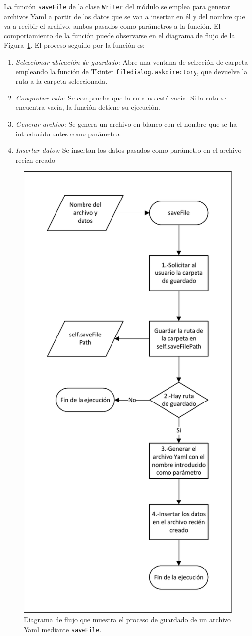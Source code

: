 La función \texttt{saveFile} de la clase \texttt{Writer} del módulo se emplea para generar archivos \acrshort{Yaml} a partir de los datos que se van a insertar en él y del nombre que va a recibir el archivo, ambos pasados como parámetros a la función. El comportamiento de la función puede observarse en el diagrama de flujo de la Figura~\ref{fig:DiagramaFlujoSaveFile}. El proceso seguido por la función es:
\begin{enumerate}
    \item \textit{Seleccionar ubicación de guardado:} Abre una ventana de selección de carpeta empleando la función de Tkinter \texttt{filedialog.askdirectory}, que devuelve la ruta a la carpeta seleccionada.
    \item \textit{Comprobar ruta:} Se comprueba que la ruta no esté vacía. Si la ruta se encuentra vacía, la función detiene su ejecución.
    \item \textit{Generar archivo:} Se genera un archivo en blanco con el nombre que se ha introducido antes como parámetro.
    \item \textit{Insertar datos:} Se insertan los datos pasados como parámetro en el archivo recién creado.
\end{enumerate}

\begin{figure}[htbp]
\centering
\includegraphics[width=.47\textwidth]{fig/Diagramas de flujo/saveFile.pdf}
\caption{Diagrama de flujo que muestra el proceso de guardado de un archivo \acrshort{Yaml} mediante \texttt{saveFile}.}
\label{fig:DiagramaFlujoSaveFile}
\end{figure}

